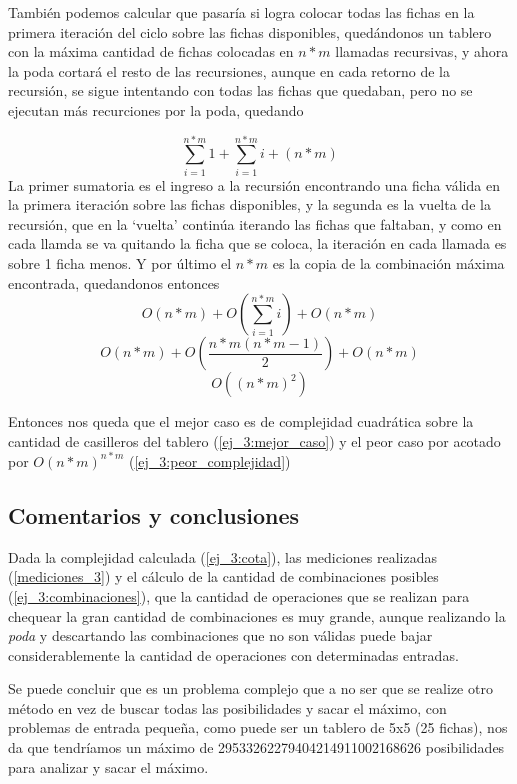 Tambi\'en podemos calcular que pasar\'ia si logra colocar todas las fichas en la primera iteraci\'on del ciclo sobre las fichas disponibles, qued\'andonos un tablero con la m\'axima cantidad de fichas colocadas en $n*m$ llamadas recursivas, y ahora la poda cortar\'a el resto de las recursiones, aunque en cada retorno de la recursi\'on, se sigue intentando con todas las fichas que quedaban, pero no se ejecutan m\'as recurciones por la poda, quedando

\begin{equation*}
	\sum_{i=1}^{n*m} 1 + \sum_{i=1}^{n*m}i + (n*m)
\end{equation*}
La primer sumatoria es el ingreso a la recursi\'on encontrando una ficha v\'alida en la primera iteraci\'on sobre las fichas disponibles, y la segunda es la vuelta de la recursi\'on, que en la `vuelta' contin\'ua iterando las fichas que faltaban, y como en cada llamda se va quitando la ficha que se coloca, la iteraci\'on en cada llamada es sobre 1 ficha menos. Y por \'ultimo el $n*m$ es la copia de la combinaci\'on m\'axima encontrada, quedandonos entonces
\begin{equation*}
	O(n*m) + O(\sum_{i=1}^{n*m}i) + O(n*m)
\end{equation*}
\begin{equation*}
	O(n*m) + O\left(\frac{n*m(n*m - 1)}{2}\right) + O(n*m)
\end{equation*}
\begin{equation}
	O\left((n*m)^2\right) \label{ej_3:mejor_caso}
\end{equation}

Entonces nos queda que el mejor caso es de complejidad cuadr\'atica sobre la cantidad de casilleros del tablero (\ref{ej_3:mejor_caso}) y el peor caso por acotado por $O(n*m)^{n*m}$ (\ref{ej_3:peor_complejidad})

\subsection{Comentarios y conclusiones}

Dada la complejidad calculada (\ref{ej_3:cota}), las mediciones realizadas (\ref{mediciones_3}) y el c\'alculo de la cantidad de combinaciones posibles (\ref{ej_3:combinaciones}), que la cantidad de operaciones que se realizan para chequear la gran cantidad de combinaciones es muy grande,
aunque realizando la \emph{poda} y descartando las combinaciones que no son v\'alidas puede bajar considerablemente la cantidad de operaciones con determinadas entradas.

Se puede concluir que es un problema complejo que a no ser que se realize otro m\'etodo en vez de buscar todas las posibilidades y sacar el m\'aximo, con problemas de entrada peque\~na, como puede ser un tablero de 5x5 (25 fichas), nos da que tendr\'iamos un m\'aximo de 29533262279404214911002168626 posibilidades para analizar y sacar el m\'aximo.

